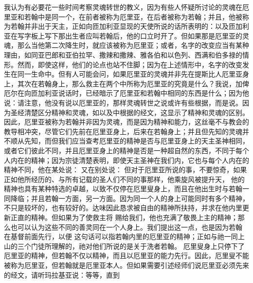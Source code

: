 我认为有必要花一些时间考察灵魂转世的教义，因为有些人怀疑所讨论的灵魂在厄里亚和若翰中是同一个，在前者被称为厄里亚，在后者被称为若翰；并且，他被称为若翰并非出于天主，正如向匝加利亚显现的天使所说的话所表明的：以及匝加利亚在写字板上写下那出生者应叫若翰后，他的口立时开了。但如果那是厄里亚的灵魂，那么当他第二次降生时，就应该被称为厄里亚；或者，名字的改变应当有某种理由，如同亚巴郎和亚伯拉罕、撒辣和撒辣、雅各伯和以色列、西满和伯多禄的情形。然而，即使这样，他们的论点也站不住脚；因为在上述情形中，名字的改变发生在同一生命中。但有人可能会问，如果厄里亚的灵魂并非先在提斯比人厄里亚身上，其次在若翰身上，那么救主在两个中所称为厄里亚的究竟是什么？我说，加俾厄尔在向匝加利亚说话时，已经暗示了厄里亚和若翰中相同的东西是什么；因为他说：请注意，他没有说以厄里亚的，那样灵魂转世之说或许有些根据，而是说。因为圣经清楚区分精神和灵魂，如以及中根据的经文，这显示了精神和灵魂的区别。因此，厄里亚被称为若翰并非因为灵魂，而是因为精神和能力，这丝毫不与教会的教导相冲突，尽管它们先前在厄里亚身上，后来在若翰身上；并且但先知的灵魂并不顺从先知，而但我们应当查考厄里亚的精神是否与厄里亚身上的天主圣神相同，或者它们彼此不同，并且厄里亚身上的精神是否是一种超自然的东西，不同于每个人内在的精神；因为宗徒清楚表明，即使天主圣神在我们内，它也与每个人内在的精神不同，他在某处说： 又在别处说： 但对于厄里亚所说的事，不要惊奇，如果正如他所经历的、与所有记载的圣人们不同的事那样，他乘旋风被提升天， 他的精神也具有某种特选的卓越，以致不仅停在厄里叟身上，而且在他出生时与若翰一同降临；并且若翰一方面，另一方面。因为同一个人的身上可能同时有多个精神，不只是较坏的，也有较好的。达味因此恳求被自由的精神所扶持，并求在他内里更新正直的精神。但如果为了使救主将 赐给我们，他也充满了敬畏上主的精神；那么也可以认为这些不同的善灵同在一个人身上。我们提出这一点，也是因为若翰 在基督前面先行，以便 这句话可以指若翰内里的厄里亚的精神；正如与祂一同上山的三个门徒所理解的，祂对他们所说的是关于洗者若翰。 厄里叟身上只停下了厄里亚的精神，但若翰不仅以精神，而且以厄里亚的能力先行。因此，厄里叟不能被称为厄里亚，但若翰就是厄里亚本人。但如果需要引述经师们说厄里亚必须先来的经文，请听玛拉基亚说：等等，直到 